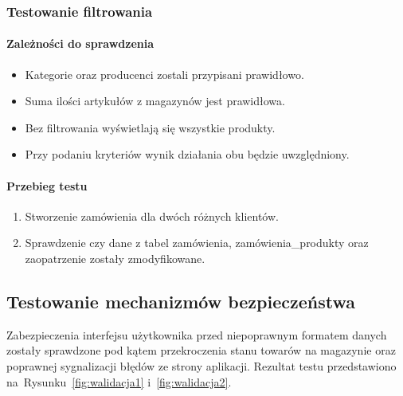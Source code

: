 \documentclass[a4paper, 12pt]{article}
\begin{document}
\subsubsection{Testowanie filtrowania}
\paragraph{Zależności do sprawdzenia}
\begin{itemize}
\item Kategorie oraz producenci zostali przypisani prawidłowo.
\item Suma ilości artykułów z magazynów jest prawidłowa.
\item Bez filtrowania wyświetlają się wszystkie produkty.
\item Przy podaniu kryteriów wynik działania obu będzie uwzględniony.
\end{itemize}
\paragraph{Przebieg testu}
\begin{enumerate}
\item Stworzenie zamówienia dla dwóch różnych klientów.
\item Sprawdzenie czy dane z tabel zamówienia, zamówienia\_produkty oraz zaopatrzenie zostały zmodyfikowane.
\end{enumerate}
\subsection{Testowanie mechanizmów bezpieczeństwa}
Zabezpieczenia interfejsu użytkownika przed niepoprawnym formatem danych zostały sprawdzone pod kątem przekroczenia stanu towarów na magazynie oraz poprawnej sygnalizacji błędów ze strony aplikacji. Rezultat testu przedstawiono na~Rysunku~\ref{fig:walidacja1} i~\ref{fig:walidacja2}.
\end{document}
